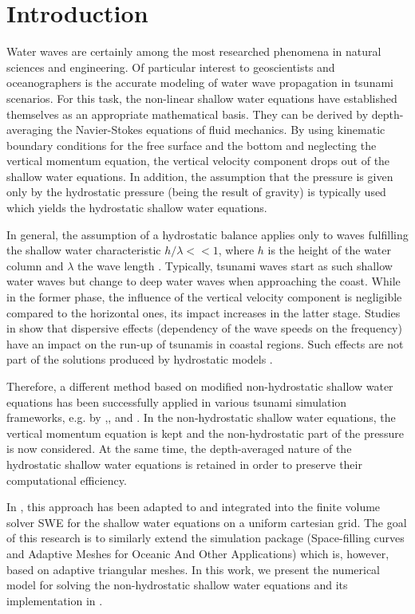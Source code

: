 
\section{Introduction}

Water waves are certainly among the most researched phenomena in natural sciences and engineering. Of particular interest to geoscientists and oceanographers is the accurate modeling of water wave propagation in tsunami scenarios. For this task, the non-linear shallow water equations have established themselves as an appropriate mathematical basis. They can be derived by depth-averaging the Navier-Stokes equations of fluid mechanics. By using kinematic boundary conditions for the free surface and the bottom and neglecting the vertical momentum equation, the vertical velocity component drops out of the shallow water equations. In addition, the assumption that the pressure is given only by the hydrostatic pressure (being the result of gravity) is typically used which yields the hydrostatic shallow water equations. 

In general, the assumption of a hydrostatic balance applies only to waves fulfilling the shallow water characteristic $h/\lambda <<1$, where $h$ is the height of the water column and $\lambda$ the wave length \cite{levin2008physics}. Typically, tsunami waves start as such shallow water waves but change to deep water waves when approaching the coast. While in the former phase, the influence of the vertical velocity component is negligible compared to the horizontal ones, its impact increases in the latter stage. Studies in \cite{horrillo} show that dispersive effects (dependency of the wave speeds on the frequency) have an impact on the run-up of tsunamis in coastal regions. Such effects are not part of the solutions produced by hydrostatic models \cite{horrillo}. 

Therefore, a different method based on modified non-hydrostatic shallow water equations has been successfully applied in various tsunami simulation frameworks, e.g. by \cite{fuchs},\cite{cui},\cite{walters} and \cite{stelling2003accurate}. In the non-hydrostatic shallow water equations, the vertical momentum equation is kept and the non-hydrostatic part of the pressure is now considered. At the same time, the depth-averaged nature of the hydrostatic shallow water equations is retained in order to preserve their computational efficiency. 

In \cite{samfass14extension}, this approach has been adapted to and integrated into the finite volume solver SWE for the shallow water equations on a uniform cartesian grid. The goal of this research is to similarly extend the simulation package \samoa (Space-filling curves
and Adaptive Meshes for Oceanic And Other Applications) which is, however, based on adaptive triangular meshes. In this work, we present the numerical model for solving the non-hydrostatic shallow water equations and its implementation in \samoa.

